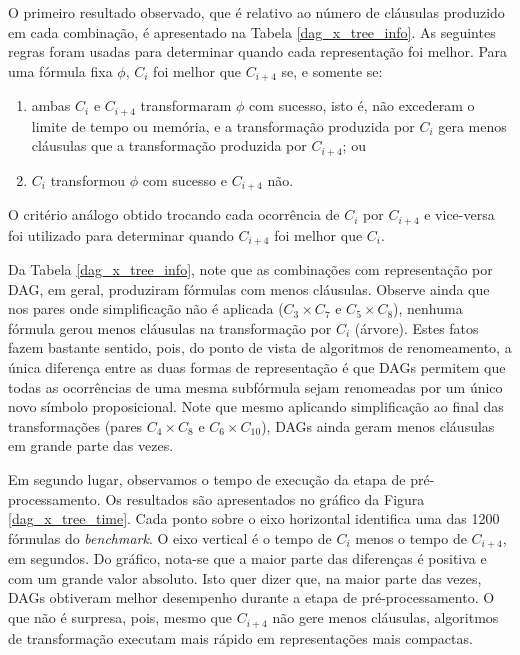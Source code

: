 O primeiro resultado observado, que é relativo ao número de cláusulas produzido em cada combinação, é apresentado na Tabela \ref{dag_x_tree_info}. As seguintes regras foram usadas para determinar quando cada representação foi melhor. Para uma fórmula fixa $\phi$, $C_i$ foi melhor que $C_{i+4}$ se, e somente se:
\begin{enumerate}
	\item ambas $C_i$ e $C_{i+4}$ transformaram $\phi$ com sucesso, isto é, não excederam o limite de tempo ou memória, e a transformação produzida por $C_i$ gera menos cláusulas que a transformação produzida por $C_{i+4}$; ou
	\item $C_i$ transformou $\phi$ com sucesso e $C_{i+4}$ não.
\end{enumerate}
O critério análogo obtido trocando cada ocorrência de $C_i$ por $C_{i+4}$ e vice-versa foi utilizado para determinar quando $C_{i+4}$ foi melhor que $C_i$.


Da Tabela \ref{dag_x_tree_info}, note que as combinações com representação por DAG, em geral, produziram fórmulas com menos cláusulas. Observe ainda que nos pares onde simplificação não é aplicada ($C_3 \times C_7$ e $C_5 \times C_8$), nenhuma fórmula gerou menos cláusulas na transformação por $C_i$ (árvore). Estes fatos fazem bastante sentido, pois, do ponto de vista de algoritmos de renomeamento, a única diferença entre as duas formas de representação é que DAGs permitem que todas as ocorrências de uma mesma subfórmula sejam renomeadas por um único novo símbolo proposicional. Note que mesmo aplicando simplificação ao final das transformações (pares $C_4 \times C_8$ e $C_6 \times C_{10}$), DAGs ainda geram menos cláusulas em grande parte das vezes.

Em segundo lugar, observamos o tempo de execução da etapa de pré-processamento. Os resultados são apresentados no gráfico da Figura \ref{dag_x_tree_time}. Cada ponto sobre o eixo horizontal identifica uma das 1200 fórmulas do \textit{benchmark}. O eixo vertical é o tempo de $C_i$ menos o tempo de $C_{i+4}$, em segundos. Do gráfico, nota-se que a maior parte das diferenças é positiva e com um grande valor absoluto. Isto quer dizer que, na maior parte das vezes, DAGs obtiveram melhor desempenho durante a etapa de pré-processamento. O que não é surpresa, pois, mesmo que $C_{i+4}$ não gere menos cláusulas, algoritmos de transformação executam mais rápido em representações mais compactas.


